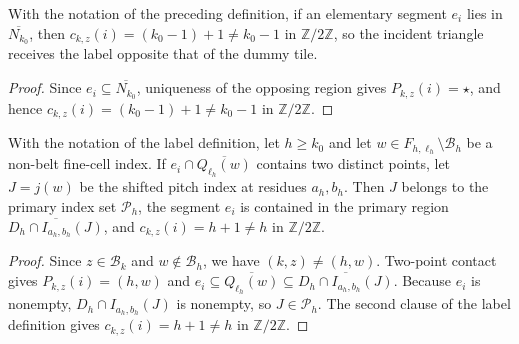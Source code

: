 \begin{lemma}
    \label{thm:area_law_belt_fan_dummy_color}
    \leanok
    With the notation of the preceding definition, if an elementary segment
    $e_i$ lies in $\overline{N_{k_0}}$, then
    $c_{k,z}(i)=(k_0-1)+1\ne k_0-1$ in $\mathbb Z/2\mathbb Z$, so the incident
    triangle receives the label opposite that of the dummy tile.
\end{lemma}
\begin{proof}\leanok
    Since $e_i\subseteq\overline{N_{k_0}}$, uniqueness of the opposing region
    gives $P_{k,z}(i)=\star$, and hence $c_{k,z}(i)=(k_0-1)+1\ne k_0-1$ in
    $\mathbb Z/2\mathbb Z$.
\end{proof}

\begin{lemma}
    \label{thm:area_law_belt_fan_nonbelt_color}
    \leanok
    With the notation of the label definition, let $h\ge k_0$ and let
    $w\in F_{h,\ell_h}\setminus\mathcal B_h$ be a non-belt fine-cell index.
    If $e_i\cap\overline{Q_{\ell_h}(w)}$ contains two distinct points,
    let $J=j(w)$ be the shifted pitch index at residues $a_h,b_h$.
    Then $J$ belongs to the primary index set $\mathcal P_h$,
    the segment $e_i$ is contained in the primary region
    $\overline{D_h\cap I_{a_h,b_h}(J)}$, and
    $c_{k,z}(i)=h+1\ne h$ in $\mathbb Z/2\mathbb Z$.
\end{lemma}
\begin{proof}\leanok
    Since $z\in\mathcal B_k$ and $w\notin\mathcal B_h$, we have $(k,z)\ne(h,w)$.
    Two-point contact gives $P_{k,z}(i)=(h,w)$ and
    $e_i\subseteq\overline{Q_{\ell_h}(w)}\subseteq
        \overline{D_h\cap I_{a_h,b_h}(J)}$.
    Because $e_i$ is nonempty, $D_h\cap I_{a_h,b_h}(J)$ is nonempty, so
    $J\in\mathcal P_h$. The second clause of the label definition gives
    $c_{k,z}(i)=h+1\ne h$ in $\mathbb Z/2\mathbb Z$.
\end{proof}

